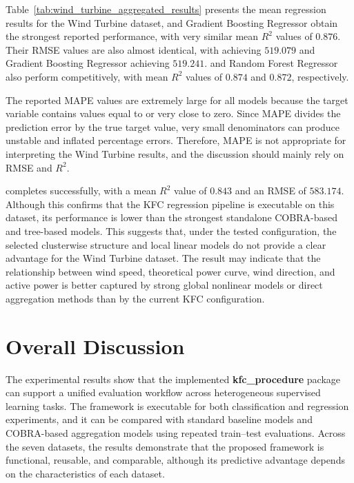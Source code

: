 \hs Table~\ref{tab:wind_turbine_aggregated_results} presents the mean regression results for the Wind Turbine dataset,  and Gradient Boosting Regressor obtain the strongest reported performance, with very similar mean $R^2$ values of $0.876$. Their RMSE values are also almost identical, with  achieving $519.079$ and Gradient Boosting Regressor achieving $519.241$.  and Random Forest Regressor also perform competitively, with mean $R^2$ values of $0.874$ and $0.872$, respectively.

The reported MAPE values are extremely large for all models because the target variable contains values equal to or very close to zero. Since MAPE divides the prediction error by the true target value, very small denominators can produce unstable and inflated percentage errors. Therefore, MAPE is not appropriate for interpreting the Wind Turbine results, and the discussion should mainly rely on RMSE and $R^2$.

 completes successfully, with a mean $R^2$ value of $0.843$ and an RMSE of $583.174$. Although this confirms that the KFC regression pipeline is executable on this dataset, its performance is lower than the strongest standalone COBRA-based and tree-based models. This suggests that, under the tested configuration, the selected clusterwise structure and local linear models do not provide a clear advantage for the Wind Turbine dataset. The result may indicate that the relationship between wind speed, theoretical power curve, wind direction, and active power is better captured by strong global nonlinear models or direct aggregation methods than by the current KFC configuration.

\section{Overall Discussion}
\label{sec:overall_discussion_results}

\hs The experimental results show that the implemented \textbf{kfc\_procedure} package can support a unified evaluation workflow across heterogeneous supervised learning tasks. The framework is executable for both classification and regression experiments, and it can be compared with standard baseline models and COBRA-based aggregation models using repeated train--test evaluations. Across the seven datasets, the results demonstrate that the proposed framework is functional, reusable, and comparable, although its predictive advantage depends on the characteristics of each dataset.


